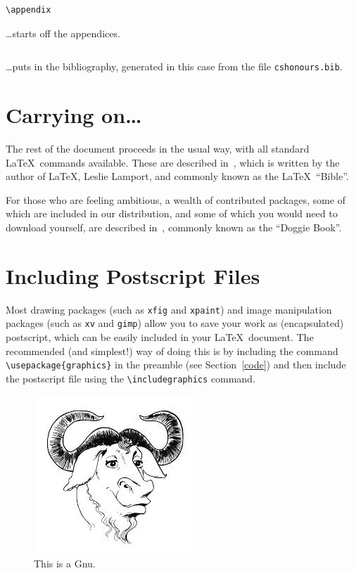 \documentclass{cshonours}
\begin{document}
\begin{verbatim}
\appendix
\end{verbatim}
\ldots starts off the appendices.

\begin{verbatim}

\end{verbatim}
\ldots puts in the bibliography, generated in this case from the
file {\tt cshonours.bib}.


\section{Carrying on\ldots}

The rest of the document proceeds in the usual way, with all standard
\LaTeX\ commands available. These are described in~\cite{bible}, which
is written by the author of \LaTeX, Leslie Lamport, and commonly known
as the \LaTeX\ ``Bible''.

For those who are feeling ambitious, a wealth of contributed
packages, some of which are included in our distribution, and some of
which you would need to download yourself, are described
in~\cite{doggie}, commonly known as the ``Doggie Book''.


\section{Including Postscript Files}

Most drawing packages (such as {\tt xfig} and {\tt xpaint}) and image
manipulation packages (such as {\tt xv} and {\tt gimp}) allow you to
save your work as (encapsulated) postscript, which can be easily
included in your \LaTeX\ document. The recommended (and simplest!) way
of doing this is by including the command \verb!\usepackage{graphics}!
in the preamble (see Section~\ref{code}) and then include the
postscript file using the \verb!\includegraphics! command.

\begin{figure}
\begin{center}
\includegraphics{gnu}
\end{center}
\caption{This is a Gnu.}
\label{gnu}
\end{figure}
\end{document}
